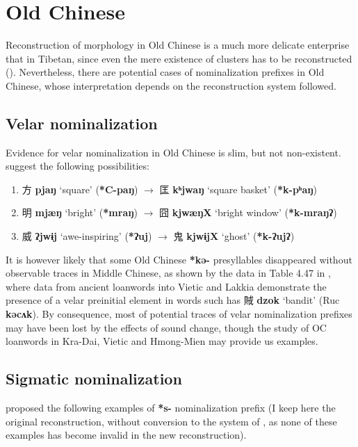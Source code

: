 \documentclass[oneside,a4paper,11pt]{article}
\newcommand{\ipa}[1]{\textbf{{\phon\mbox{#1}}}} %
\newcommand{\zh}[1]{{\cn #1}}
\newcommand{\zhc}[2]{\zh{#1} \ipa{#2}}
\begin{document}
 

\section{Old Chinese}
Reconstruction of morphology in Old Chinese is a much more delicate enterprise that in Tibetan, since even the mere existence of clusters has to be reconstructed (\citealt{gong17clusters}). Nevertheless, there are potential cases of nominalization prefixes in Old Chinese, whose interpretation depends on the reconstruction system followed.

\subsection{Velar nominalization}
Evidence for velar nominalization in Old Chinese is slim, but not non-existent. \citet[57]{bs14oc} suggest the following possibilities:

\begin{enumerate}
\item \zhc{方}{pjaŋ} ‘square’ (\ipa{*C-paŋ})  $\rightarrow$ \zhc{匡}{kʰjwaŋ} ‘square basket’   (\ipa{*k-pʰaŋ})
\item \zhc{明}{mjæŋ} ‘bright’ (\ipa{*mraŋ})  $\rightarrow$ \zhc{囧}{kjwæŋX} ‘bright window’   (\ipa{*k-mraŋʔ})
\item \zhc{威}{ʔjwɨj} ‘awe-inspiring’ (\ipa{*ʔuj})  $\rightarrow$ \zhc{鬼}{kjwɨjX} ‘ghost’   (\ipa{*k-ʔujʔ})
\end{enumerate}

It is however likely that some Old Chinese \ipa{*kə-} presyllables disappeared without observable traces in Middle Chinese, as shown by the data in Table 4.47 in \citet[153]{bs14oc}, where data from ancient loanwords into Vietic and Lakkia demonstrate the presence of a velar preinitial element in words such has \zhc{賊}{dzok} `bandit' (Ruc \ipa{kəcʌk}). By consequence, most of potential traces of velar nominalization prefixes may have been lost by the effects of sound change, though the study of OC loanwords in Kra-Dai, Vietic and Hmong-Mien may provide us examples.

\subsection{Sigmatic nominalization}
\citet[73]{sagart99roc} proposed the following examples of \ipa{*s-} nominalization prefix (I keep here the original reconstruction, without conversion to the system of \citealt{bs14oc}, as none of these examples has become invalid in the new reconstruction).
\end{document}
